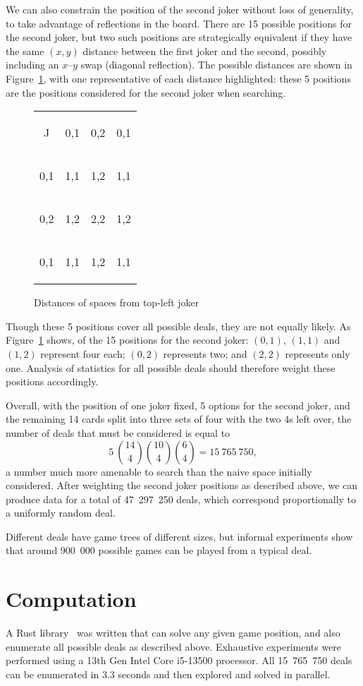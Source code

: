 \documentclass[a4paper, twocolumn]{article}
\newcommand\card[1]{\begin{tcolorbox}#1\end{tcolorbox}}
\newcommand\emphcard[1]{\begin{tcolorbox}[colback=red!30]#1\end{tcolorbox}}
\newcommand\customboard[8]{
  \setlength{\tabcolsep}{0.1cm}
  \begin{tabular}{c c c c}
    #1 & #2 & #3 & #4 \\
    #5 & #6 & #7 & #8 \\
    \customboardmore
}
\newcommand\customboardmore[8]{
    #1 & #2 & #3 & #4 \\
    #5 & #6 & #7 & #8
  \end{tabular}
}
\begin{document}
We can also constrain the position of the second joker without loss of
generality, to take advantage of reflections in the board. There are 15 possible
positions for the second joker, but two such positions are strategically
equivalent if they have the same $(x, y)$ distance between the first joker and
the second, possibly including an $x$--$y$ swap (diagonal reflection). The
possible distances are shown in Figure~\ref{fig:joker-distances}, with one
representative of each distance highlighted: these 5 positions are the positions
considered for the second joker when searching.

\begin{figure}[ht]
  \centering
  \customboard
  {\card{J}} {\emphcard{0,1}} {\emphcard{0,2}} {\card{0,1}}
  {\card{0,1}} {\emphcard{1,1}} {\emphcard{1,2}} {\card{1,1}}
  {\card{0,2}} {\card{1,2}} {\emphcard{2,2}} {\card{1,2}}
  {\card{0,1}} {\card{1,1}} {\card{1,2}} {\card{1,1}}
  \caption{Distances of spaces from top-left joker}
  \label{fig:joker-distances}
\end{figure}

Though these 5 positions cover all possible deals, they are not equally
likely. As Figure~\ref{fig:joker-distances} shows, of the 15 positions for the
second joker: $(0,1)$, $(1,1)$ and $(1,2)$ represent four each; $(0,2)$
represents two; and $(2,2)$ represents only one. Analysis of statistics for all
possible deals should therefore weight these positions accordingly.

Overall, with the position of one joker fixed, 5 options for the second joker,
and the remaining 14 cards split into three sets of four with the two 4s left
over, the number of deals that must be considered is equal to
\[5~\binom{14}{4} \binom{10}{4} \binom{6}{4} = 15~765~750,\]
a number much more amenable to search than the naive space initially considered.
After weighting the second joker positions as described above, we can produce
data for a total of 47~297~250 deals, which correspond proportionally to a
uniformly random deal.

Different deals have game trees of different sizes, but informal experiments
show that around 900~000 possible games can be played from a typical deal.


\section{Computation}

A Rust library~\cite{github} was written that can solve any given game position,
and also enumerate all possible deals as described above. Exhaustive experiments
were performed using a 13th Gen Intel Core i5-13500 processor. All 15~765~750
deals can be enumerated in 3.3 seconds and then explored and solved in parallel.
\end{document}
